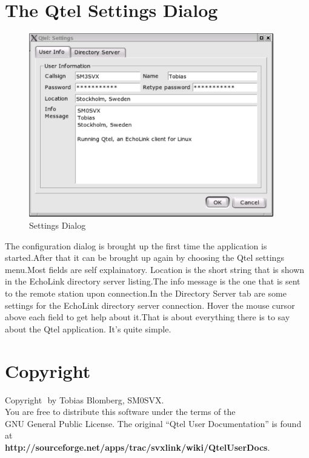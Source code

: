 \documentclass[paper=a4,fontsize=12pt]{scrartcl}
\begin{document}
\section{The Qtel Settings Dialog}
   \begin{figure}[H]
      \centering
      \includegraphics[height=80mm]{qtel-settings.pdf}
      \caption[The Qtel Settings Dialog]{Settings Dialog}
   \end{figure}

   The configuration dialog is brought up the first time the application is started.{\kern2pt}After that it can be brought up again by 
   choosing the Qtel settings menu.{\kern3pt}Most fields are self explainatory. Location is the short string that is shown in the EchoLink 
   directory server listing.{\kern3pt}The info message is the one that is sent to the remote station upon connection.{\kern2pt}In the
   Directory Server tab are some settings for the EchoLink directory server connection. Hover the mouse cursor above each field to get help 
   about it.{\kern2.5pt}That is about everything there is to say about the Qtel application. It's quite simple.

\section{Copyright}
   Copyright \textcopyright \,\,by Tobias Blomberg, SM0SVX.\\
   You are free to distribute this software under the terms of the\\
   GNU General Public License. The original ``Qtel User Documentation'' is found at\\
   \textbf{http://sourceforge.net/apps/trac/svxlink/wiki/QtelUserDocs}.\\
\end{document}
